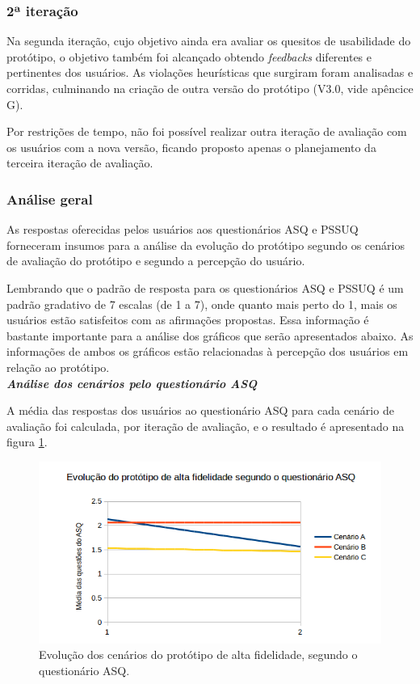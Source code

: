       \subsubsection{2ª iteração}
	
	Na segunda iteração, cujo objetivo ainda era avaliar os quesitos de usabilidade do protótipo, o objetivo também
	foi alcançado obtendo \textit{feedbacks} diferentes e pertinentes dos usuários. As violações heurísticas que surgiram
	foram analisadas e corridas, culminando na criação de outra versão do protótipo (V3.0, vide apêncice G).
	
	Por restrições 
	de tempo, não foi possível realizar outra iteração de avaliação com os usuários com a nova versão, ficando proposto apenas
	o planejamento da terceira iteração de avaliação.
      
      \subsubsection{Análise geral}
	
	As respostas oferecidas pelos usuários aos questionários ASQ e PSSUQ forneceram insumos para a análise da
	evolução do protótipo segundo os cenários de avaliação do protótipo e segundo a percepção do usuário.
	
	Lembrando que o padrão de resposta para os questionários ASQ e PSSUQ é um padrão gradativo de 7 escalas (de 1 a 7),
	onde quanto mais perto do 1, mais os usuários estão satisfeitos com as afirmações propostas. Essa informação é 
	bastante importante para a análise dos gráficos que serão apresentados abaixo. As informações de ambos os gráficos 
	estão relacionadas à percepção dos usuários em relação ao protótipo.\\
	
	\noindent
	\emph{\textbf{Análise dos cenários pelo questionário ASQ}}
	
	A média das respostas dos usuários ao questionário ASQ para cada cenário de avaliação foi calculada, por
	iteração de avaliação, e o resultado é apresentado na figura \ref{evolucao_prototipo_alta_fidelidade_ASQ}.
	
	\begin{figure}[!htpb]
	  \centering
	  \includegraphics[scale=0.8]{editaveis/figuras/evolucao_prototipo_alta_fidelidade_ASQ}
	  \caption[Evolução dos cenários do protótipo de alta fidelidade, segundo o questionário ASQ]
	    {Evolução dos cenários do protótipo de alta fidelidade, segundo o questionário ASQ.}
	  \label{evolucao_prototipo_alta_fidelidade_ASQ}
	\end{figure}
	
